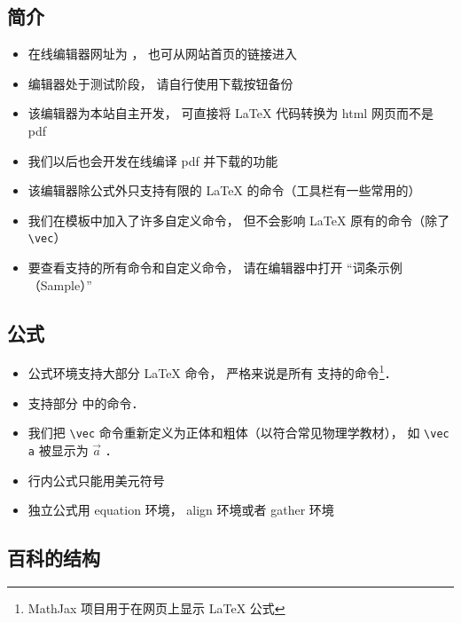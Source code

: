 
\subsection{简介}
\begin{itemize}
\item 在线编辑器网址为 ， 也可从网站首页的链接进入
\item 编辑器处于测试阶段， 请自行使用下载按钮备份
\item 该编辑器为本站自主开发， 可直接将 LaTeX 代码转换为 html 网页而不是 pdf
\item 我们以后也会开发在线编译 pdf 并下载的功能
\item 该编辑器除公式外只支持有限的 LaTeX 的命令（工具栏有一些常用的）
\item 我们在模板中加入了许多自定义命令， 但不会影响 LaTeX 原有的命令（除了 \lstinline|\vec|）
\item 要查看支持的所有命令和自定义命令， 请在编辑器中打开 “词条示例（Sample）”
\end{itemize}

\subsection{公式}
\begin{itemize}
\item 公式环境支持大部分 LaTeX 命令， 严格来说是所有  支持的命令\footnote{MathJax 项目用于在网页上显示 LaTeX 公式}．
\item 支持部分 中的命令．
\item 我们把 \lstinline|\vec| 命令重新定义为正体和粗体（以符合常见物理学教材）， 如 \lstinline|\vec a| 被显示为 $\vec a$ ．
\item 行内公式只能用美元符号
\item 独立公式用 equation 环境， align 环境或者 gather 环境
\end{itemize}

\subsection{百科的结构}

